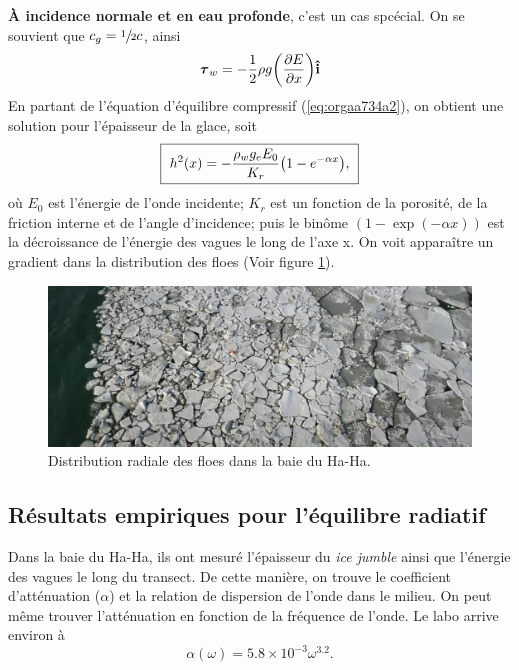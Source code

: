 \documentclass[10pt]{article}
\numberwithin{equation}{section}
\newcommand{\ivf}{\vb{\hat{i}}}
\begin{document}
\textbf{À incidence normale et en eau profonde}, c'est un cas spcécial.
On se souvient que \(c_g = \sfrac{1}{2} c\), ainsi
\begin{equation}
   \boldsymbol{\tau}_w = -\frac{1}{2}\rho g \qty(\pdv{E}{x}) \ivf
\end{equation}
En partant de l'équation d'équilibre compressif (\ref{eq:orgaa734a2}), on obtient une solution pour l'épaisseur de la glace, soit
\begin{equation}
   \boxed{\ h^2(x) = - \frac{\rho_w g_e E_0}{K_r}\qty(1-e^{-\alpha x}),\ }
\end{equation}
où \(E_0\) est l'énergie de l'onde incidente; \(K_r\) est un fonction de la porosité, de la friction interne et de l'angle d'incidence; puis le binôme \((1-\exp(-\alpha x))\) est la décroissance de l'énergie des vagues le long de l'axe x.
On voit apparaître un gradient dans la distribution des floes (Voir figure \ref{fig:org382a1e2}).

\begin{figure}[htbp]
\centering
\includegraphics[width=.9\linewidth]{Figures/photos/gradient_floes.png}
\caption{\label{fig:org382a1e2}Distribution radiale des floes dans la baie du Ha-Ha.}
\end{figure}

\subsection{Résultats empiriques pour l'équilibre radiatif}
\label{sec:org3071eaa}

Dans la baie du Ha-Ha, ils ont mesuré l'épaisseur du \emph{ice jumble} ainsi que l'énergie des vagues le long du transect.
De cette manière, on trouve le coefficient d'atténuation (\(\alpha\))  et la relation de dispersion de l'onde dans le milieu.
On peut même trouver l'atténuation en fonction de la fréquence de l'onde.
Le labo arrive environ à
\begin{equation}
   \alpha(\omega)  = 5.8 \times 10^{-3} \omega^{3.2}.
\end{equation}
\end{document}
